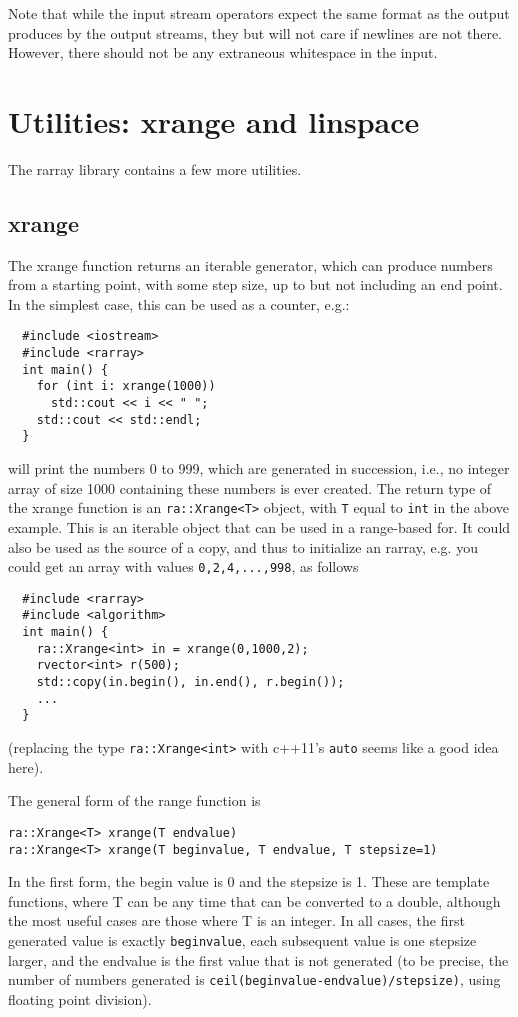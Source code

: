 \documentclass[11pt,twoside]{article}
\begin{document}
Note that while the input stream operators expect the same format as
the output produces by the output streams, they but will
not care if newlines are not there. However, there should not be any extraneous
whitespace in the input.

\section{Utilities: xrange and linspace}

The rarray library contains a few more utilities.

\subsection{xrange}

The xrange function returns an iterable generator, which can produce
numbers from a starting point, with some step size, up to but not
including an end point.  In the simplest case, this can be used as a
counter, e.g.:
\begin{verbatim}
  #include <iostream>
  #include <rarray>
  int main() {
    for (int i: xrange(1000))
      std::cout << i << " ";
    std::cout << std::endl;
  }
\end{verbatim}
will print the numbers 0 to 999, which are generated in succession,
i.e., no integer array of size 1000 containing these numbers is ever
created. The return type of the xrange function is an
\texttt{ra::Xrange<T>} object, with \texttt{T} equal to \texttt{int}
in the above example.  This is an iterable object that can be used in
a range-based for.  It could also be used as the source of a copy, and
thus to initialize an rarray, e.g. you could get an array with values
\texttt{0,2,4,...,998}, as follows
\begin{verbatim}
  #include <rarray>
  #include <algorithm>
  int main() {
    ra::Xrange<int> in = xrange(0,1000,2);
    rvector<int> r(500);
    std::copy(in.begin(), in.end(), r.begin());
    ...
  }
\end{verbatim}
(replacing the type \texttt{ra::Xrange<int>} with c++11's
\texttt{auto} seems like a good idea here).

The general form of the range function is
\begin{verbatim}
ra::Xrange<T> xrange(T endvalue)
ra::Xrange<T> xrange(T beginvalue, T endvalue, T stepsize=1)
\end{verbatim}
In the first form, the begin value is 0 and the stepsize is 1. These
are template functions, where T can be any time that can be converted
to a double, although the most useful cases are those where T is an
integer.  In all cases, the first generated value is exactly
\texttt{beginvalue}, each subsequent value is one stepsize larger, and
the endvalue is the first value that is not generated (to be precise,
the number of numbers generated is
\texttt{ceil(beginvalue-endvalue)/stepsize)}, using floating point
division).
\end{document}
